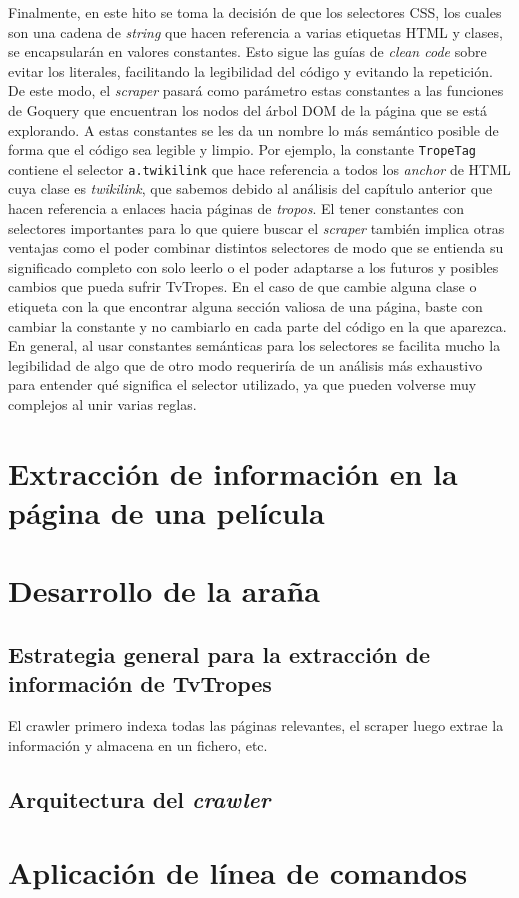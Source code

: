 Finalmente, en este hito se toma la decisión de que los selectores CSS, los
cuales son una cadena de \textit{string} que hacen referencia a varias etiquetas
HTML y clases, se encapsularán en valores constantes. Esto sigue las guías de
\textit{clean code} sobre evitar los literales, facilitando la legibilidad del
código y evitando la repetición. De este modo, el \textit{scraper} pasará como
parámetro estas constantes a las funciones de Goquery que encuentran los nodos
del árbol DOM de la página que se está explorando. A estas constantes se les da
un nombre lo más semántico posible de forma que el código sea legible y limpio.
Por ejemplo, la constante \texttt{TropeTag} contiene el selector \texttt{a.twikilink} que hace referencia a todos los \textit{anchor} de HTML
cuya clase es \textit{twikilink}, que sabemos debido al análisis del capítulo
anterior que hacen referencia a enlaces hacia páginas de \textit{tropos}. El
tener constantes con selectores importantes para lo que quiere buscar el
\textit{scraper} también implica otras ventajas como el poder combinar distintos
selectores de modo que se entienda su significado completo con solo leerlo o el
poder adaptarse a los futuros y posibles cambios que pueda sufrir TvTropes. En
el caso de que cambie alguna clase o etiqueta con la que encontrar alguna
sección valiosa de una página, baste con cambiar la constante y no cambiarlo
en cada parte del código en la que aparezca. En general, al usar constantes
semánticas para los selectores se facilita mucho la legibilidad de algo que de
otro modo requeriría de un análisis más exhaustivo para entender qué significa
el selector utilizado, ya que pueden volverse muy complejos al unir varias
reglas.

\section{Extracción de información en la página de una película}

\section{Desarrollo de la araña}

\subsection{Estrategia general para la extracción de información de TvTropes}
El crawler primero indexa todas las páginas relevantes, el scraper luego extrae
la información y almacena en un fichero, etc.

\subsection{Arquitectura del \textit{crawler}}

\section{Aplicación de línea de comandos}